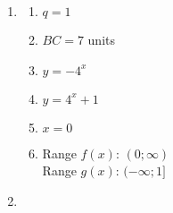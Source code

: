 \begin{eocsolutions}{}
{\begin{enumerate}[itemsep=8pt, label=\textbf{\arabic*}. ]
 \begin{enumerate}[noitemsep, label=\textbf{(\alph*)} ]
\item At $M$, $y=2^0\\=1\\$therefore the coordinates of $M$ are $(0;1)$\\
At $N$, $y= -(2^0)\\ = -1\\$therefore the coordinates of $N$ are$(0;-1)$%
\item $MN=1+1=2$ units%
\item At $P$, $x=-1$\\
$\therefore y = 2^{-1} = \frac{1}{2}.\\
$ At $Q$, $y=-(2^{-1}) = -\frac{1}{2}$.\\
Therefore length $PQ = \frac{1}{2} + \frac{1}{2} =1$ unit.%
\item $y=2^{-x}$%
\item Range $y=2^x$: $(0;\infty)$;\\
      Range $y=-2^x$: $(-\infty;0)$%
\end{enumerate}

\item %

\begin{multicols}{2}
 \begin{enumerate}[noitemsep, label=\textbf{(\alph*)} ]
\item $q=1$%
\item $BC=7$ units%
\item $y=-4^{x}$%
\item $y=4^{x}+1$%
\item $x=0$%
\item Range $f(x)$: $(0;\infty)$\\
      Range $g(x)$: $(-\infty;1]$
\end{enumerate}
\end{multicols}
\item %
\end{enumerate}}
\end{eocsolutions}
